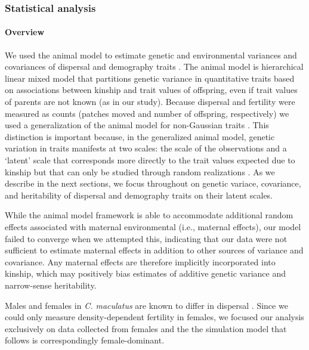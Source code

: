 \documentclass[11pt]{article}
\begin{document}
\subsubsection*{Statistical analysis}
\paragraph{Overview}
We used the animal model to estimate genetic and environmental variances and covariances of dispersal and demography traits \citep{lynch_genetics_1998,kruuk_estimating_2004,wilson_ecologists_2010}.
The animal model is hierarchical linear mixed model that partitions genetic variance in quantitative traits based on associations between kinship and trait values of offspring, even if trait values of parents are not known (as in our study).
Because dispersal and fertility were measured as counts (patches moved and number of offspring, respectively) we used a generalization of the animal model for non-Gaussian traits \citep{de2016general}.
This distinction is important because, in the generalized animal model, genetic variation in traits manifests at two scales: the scale of the observations and a `latent' scale that corresponds more directly to the trait values expected due to kinship but that can only be studied through random realizations \citep{de2016general}.
As we describe in the next sections, we focus throughout on genetic variace, covariance, and heritability of dispersal and demography traits on their latent scales.

While the animal model framework is able to accommodate additional random effects associated with maternal environmental (i.e., maternal effects), our model failed to converge when we attempted this, indicating that our data were not sufficient to estimate maternal effects in addition to other sources of variance and covariance.
Any maternal effects are therefore implicitly incorporated into kinship, which may positively bias estimates of additive genetic variance and narrow-sense heritability.

Males and females in \textit{C. maculatus} are known to differ in dispersal \citep{miller_sex_2013,ochocki_rapid_2017}.
Since we could only measure density-dependent fertility in females, we focused our analysis exclusively on data collected from females and the the simulation model that follows is correspondingly female-dominant.
\end{document}
